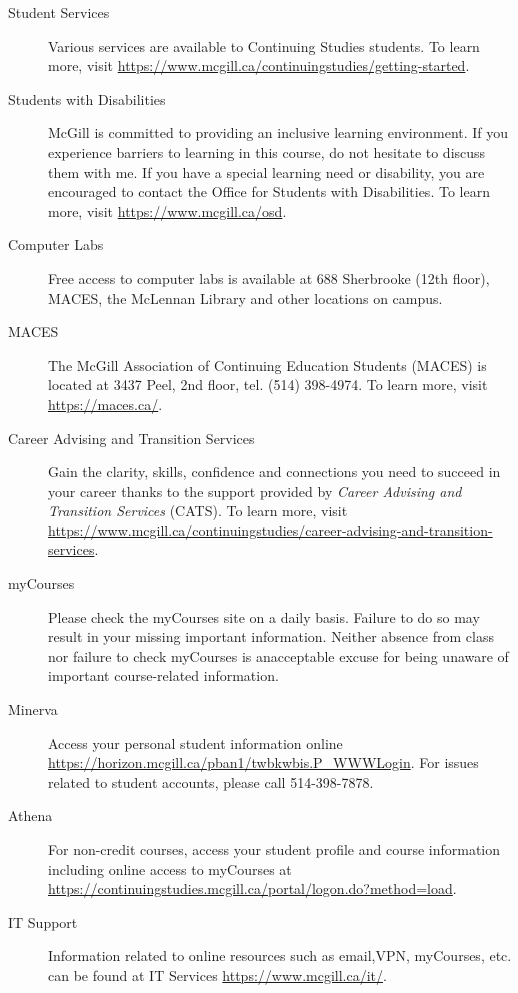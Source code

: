 \documentclass{article}
\begin{document}
\begin{description}
\item[Student Services]{Various services are available to Continuing
  Studies students. To learn more, visit \url{https://www.mcgill.ca/continuingstudies/getting-started}.}
\item[Students with Disabilities]{McGill is committed to providing an
  inclusive learning environment. If you experience barriers to
  learning in this course, do not hesitate to discuss them with me. If
  you have a special learning need or disability, you are encouraged
  to contact the Office for Students with Disabilities. To learn more,
  visit \url{https://www.mcgill.ca/osd}.}
 \item[Computer Labs]{Free access to computer labs is available at 688
   Sherbrooke (12th floor), MACES, the McLennan Library and other
   locations on campus.}
 \item[MACES]{The McGill Association of Continuing Education Students
   (MACES) is located at 3437 Peel, 2nd floor, tel. (514) 398-4974. To
   learn more, visit \url{https://maces.ca/}.}
\item[Career Advising and Transition Services]{Gain the clarity,
  skills, confidence and connections you need to succeed in your
  career thanks to the support provided by {\em Career Advising and
    Transition Services} (CATS). To learn more, visit
  \url{https://www.mcgill.ca/continuingstudies/career-advising-and-transition-services}.}
\item[myCourses]{Please check the myCourses site on a daily
  basis. Failure to do so may result in your missing important
  information. Neither absence from class nor failure to check
  myCourses is anacceptable excuse for being unaware of important
  course-related information.}
\item[Minerva]{Access your personal student information online
  \url{https://horizon.mcgill.ca/pban1/twbkwbis.P_WWWLogin}. For
  issues related to student accounts, please call 514-398-7878.}
\item[Athena]{For non-credit courses, access your student profile and
  course information including online access to myCourses at
  \url{https://continuingstudies.mcgill.ca/portal/logon.do?method=load}.}
\item[IT Support]{Information related to online resources such as
  email,VPN, myCourses, etc. can be found at IT Services
  \url{https://www.mcgill.ca/it/}.}
\end{description}

\label{LastPage}
\end{document}
